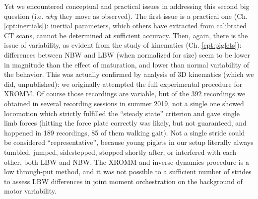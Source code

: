 Yet we encountered conceptual and practical issues in addressing this second big question (i.e. \emph{why} they move as observed).
The first issue is a practical one (Ch. \ref{cpt:inertials}): inertial parameters, which others have extracted from calibrated CT scans, cannot be determined at sufficient accuracy.
Then, again, there is the issue of variability, as evident from the study of kinematics (Ch. \ref{cpt:piglets}):
differences between NBW and LBW (when normalized for size) seem to be lower in magnitude than the effect of maturation, and lower than normal variability of the behavior.
This was actually confirmed by analysis of 3D kinematics (which we did, unpublished): we originally attempted the full experimental procedure for XROMM.
Of course those recordings are variable, but of the 392 recordings we obtained in several recording sessions in summer 2019, not a single one showed locomotion which strictly fulfilled the ``steady state'' criterion and gave single limb forces (hitting the force plate correctly was likely, but not guaranteed, and happened in 189 recordings, 85 of them walking gait).
Not a single stride could be considered ``representative'', because young piglets in our setup literally always tumbled, jumped, sidestepped, stopped shortly after, or interfered with each other, both LBW and NBW.
The XROMM and inverse dynamics procedure is a low through-put method, and it was not possible to  a sufficient number of strides to assess LBW differences in joint moment orchestration on the background of motor variability.


